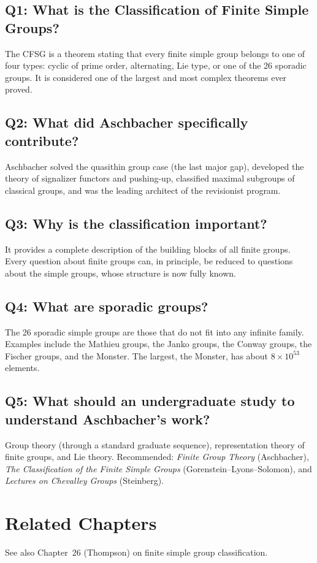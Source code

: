 \subsection*{Q1: What is the Classification of Finite Simple Groups?}
The CFSG is a theorem stating that every finite simple group belongs to one of four types: cyclic of prime order, alternating, Lie type, or one of the 26 sporadic groups. It is considered one of the largest and most complex theorems ever proved.

\subsection*{Q2: What did Aschbacher specifically contribute?}
Aschbacher solved the quasithin group case (the last major gap), developed the theory of signalizer functors and pushing-up, classified maximal subgroups of classical groups, and was the leading architect of the revisionist program.

\subsection*{Q3: Why is the classification important?}
It provides a complete description of the building blocks of all finite groups. Every question about finite groups can, in principle, be reduced to questions about the simple groups, whose structure is now fully known.

\subsection*{Q4: What are sporadic groups?}
The 26 sporadic simple groups are those that do not fit into any infinite family. Examples include the Mathieu groups, the Janko groups, the Conway groups, the Fischer groups, and the Monster. The largest, the Monster, has about $8 \times 10^{53}$ elements.

\subsection*{Q5: What should an undergraduate study to understand Aschbacher's work?}
Group theory (through a standard graduate sequence), representation theory of finite groups, and Lie theory. Recommended: \textit{Finite Group Theory} (Aschbacher), \textit{The Classification of the Finite Simple Groups} (Gorenstein--Lyons--Solomon), and \textit{Lectures on Chevalley Groups} (Steinberg).

\section{Related Chapters}
See also Chapter~26 (Thompson) on finite simple group classification.

